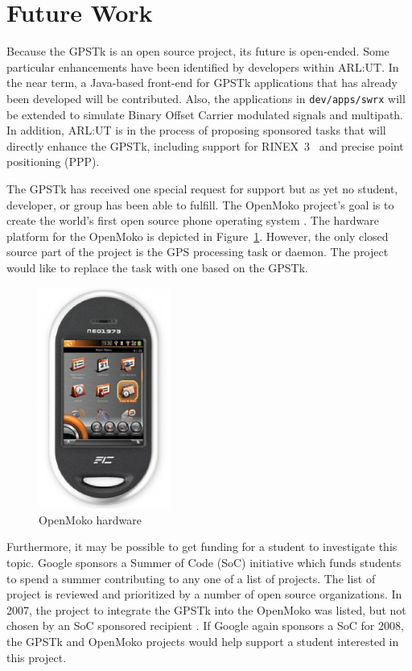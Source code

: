 \documentclass[letterpaper,ugly,10pt]{ion-gps}
\newcommand{\gpstkdir}[1]{\texttt{\mbox{#1}}}
\begin{document}
\section*{Future Work}

Because the GPSTk is an open source project, its future is open-ended. Some particular enhancements have been identified by developers within ARL:UT. In the near term, a Java-based front-end for GPSTk applications that has already been developed will be contributed. Also, the applications in \gpstkdir{dev/apps/swrx} will be extended to simulate Binary Offset Carrier modulated signals and multipath. In addition, ARL:UT is in the process of proposing sponsored tasks that will directly enhance the GPSTk, including support for \mbox{RINEX 3  \cite{rinex300format}} and precise point positioning (PPP).

The GPSTk has received one special request for support but as yet no student, developer, or group has been able to fulfill. The OpenMoko project's goal is to create the world's first open source phone operating system \cite{openmoko,openmokowiki}. The hardware platform for the OpenMoko is depicted in Figure~\ref{fig:neo1973}. However, the only closed source part of the project is the GPS processing task or daemon. The project would like to replace the task with one based on the GPSTk. 
%
\begin{figure}
	\centering
	\includegraphics[bb=0 0 200 337,width=1.7in]{neo1973.eps}
	\caption{OpenMoko hardware}
	\label{fig:neo1973}
\end{figure}

%

Furthermore, it may be possible to get funding for a student to investigate this topic. Google sponsors a Summer of Code (SoC) initiative which funds students to spend a summer contributing to any one of a list of projects. The list of project is reviewed and prioritized by a number of open source organizations. In 2007, the project to integrate the GPSTk into the OpenMoko was listed, but not chosen by an SoC sponsored recipient \cite{summerofcodemainsite,summerofcodeopenmokogpstk}. If Google again sponsors a SoC for 2008, the GPSTk and OpenMoko projects would help support a student interested in this project.
\end{document}
